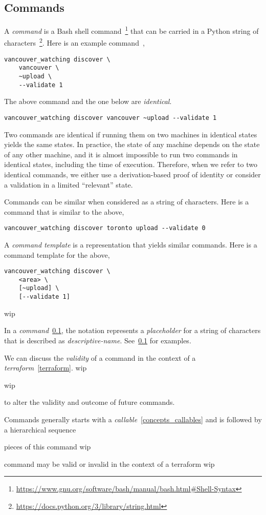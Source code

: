 \subsection{Commands}
\label{commands}

A \emph{command} is a Bash shell command~\footnote{\url{https://www.gnu.org/software/bash/manual/bash.html\#Shell-Syntax}} that can be carried in a Python string of characters~\footnote{\url{https://docs.python.org/3/library/string.html}}. Here is an example command~\cite{vanwatch},

\begin{verbatim}
vancouver_watching discover \
    vancouver \
    ~upload \
    --validate 1
\end{verbatim}

The above command and the one below are \emph{identical}.
%
\begin{verbatim}
vancouver_watching discover vancouver ~upload --validate 1
\end{verbatim}
%
Two commands are identical if running them on two machines in identical states yields the same states. In practice, the state of any machine depends on the state of any other machine, and it is almost impossible to run two commands in identical states, including the time of execution. Therefore, when we refer to two identical commands, we either use a derivation-based proof of identity or consider a validation in a limited ``relevant'' state.
 
Commands can be similar when considered as a string of characters. Here is a command that is similar to the above,
%
\begin{verbatim}
vancouver_watching discover toronto upload --validate 0
\end{verbatim}

A \emph{command template} is a representation that yields similar commands. Here is a command template for the above,

\begin{verbatim}
vancouver_watching discover \
    <area> \
    [~upload] \
    [--validate 1]
\end{verbatim}

wip

In a \emph{command}~\ref{commands}, the notation  represents a \emph{placeholder} for a string of characters that is described as \emph{descriptive-name}. See~\ref{commands} for examples.




We can discuss the \emph{validity} of a command in the context of a \emph{terraform}~\ref{terraform}. wip

wip

 to alter the validity and outcome of future commands.

Commands generally starts with a \emph{callable}~\ref{concepts_callables} and is followed by a hierarchical sequence 

pieces of this command wip

command may be valid or invalid in the context of a terraform wip

